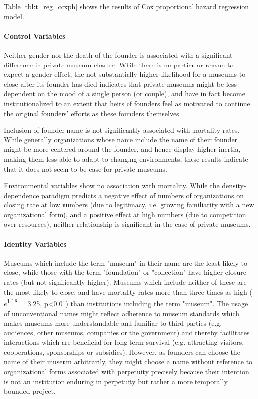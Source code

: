 \documentclass[12pt]{article}
\begin{document}
Table \ref{tbl:t_reg_coxph} shows the results of Cox proportional hazard regression model.


\paragraph*{Control Variables}


Neither gender nor the death of the founder is associated with a significant difference in private museum closure.
While there is no particular reason to expect a gender effect, the not substantially higher likelihood for a museums to close after its founder has died indicates that private museums might be less dependent on the mood of a single person (or couple), and have in fact become institutionalized to an extent that heirs of founders feel as motivated to continue the original founders' efforts as these founders themselves.

Inclusion of founder name is not significantly associated with mortality rates.
While generally organizations whose name include the name of their founder might be more centered around the founder, and hence display higher inertia, making them less able to adapt to changing environments, these results indicate that it does not seem to be case for private museums.

Environmental variables show no association with mortality.
While the density-dependence paradigm predicts a negative effect of numbers of organizations on closing rate at low numbers (due to legitimacy, i.e. growing familiarity with a new organizational form), and a positive effect at high numbers (due to competition over resources), neither relationship is significant in the case of private museums.


\paragraph*{Identity Variables}


Museums which include the term "museum" in their name are the least likely to close, while those with the term "foundation" or "collection" have higher closure rates (but not significantly higher).
Museums which include neither of these are the most likely to close, and have mortality rates more than three times as high (\(e\)\textsuperscript{1.18} = 3.25, p<0.01) than institutions including the term "museum".
The usage of unconventional names might reflect adherence to museum standards which makes museums more understandable and familiar to third parties (e.g. audiences, other museums, companies or the government) and thereby facilitates interactions which are beneficial for long-term survival (e.g. attracting visitors, cooperations, sponsorships or subsidies).
However, as founders can choose the name of their museum arbitrarily, they might choose a name without reference to organizational forms associated with perpetuity precisely because their intention is not an institution enduring in perpetuity but rather a more temporally bounded project.
\end{document}
